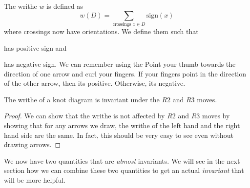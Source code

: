 \documentclass{article}
\begin{document}
\begin{definition}
    The writhe $w$ is defined as
    \begin{equation}
        w(D) = \sum_\text{crossings $x\in D$} \text{sign}(x)
    \end{equation} 
    where crossings now have orientations. We define them such that
    \begin{center}
    \end{center}
    has positive sign and
    \begin{center}
    \end{center}
    has negative sign. We can remember using the  Point your thumb towards the direction of one arrow and curl your fingers. If your fingers point in the direction of the other arrow, then its positive. Otherwise, its negative. 
\end{definition}
\begin{theorem}
    The writhe of a knot diagram is invariant under the $R2$ and $R3$ moves.
\end{theorem}
\begin{proof}
    We can show that the writhe is not affected by $R2$ and $R3$ moves by showing that for any arrows we draw, the writhe of the left hand and the right hand side are the same. In fact, this should be very easy to see even without drawing arrows.
\end{proof}
We now have two quantities that are \textit{almost} invariants. We will see in the next section how we can combine these two quantities to get an actual \textit{invariant} that will be more helpful.
\end{document}
